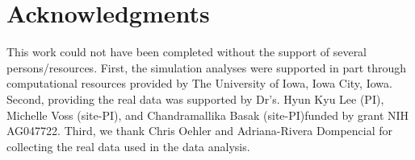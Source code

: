 \documentclass[10pt,letterpaper]{article}
\begin{document}





\section*{Acknowledgments}
This work could not have been completed without the support of several persons/resources.
First, the simulation analyses were supported in part through computational resources provided by The University of Iowa, Iowa City, Iowa.
Second, providing the real data was supported by Dr's. Hyun Kyu Lee (PI),
Michelle Voss (site-PI), and Chandramallika Basak (site-PI)funded by grant NIH AG047722.
Third, we thank Chris Oehler and Adriana-Rivera Dompencial for collecting the real data used in the data analysis.
\end{document}

